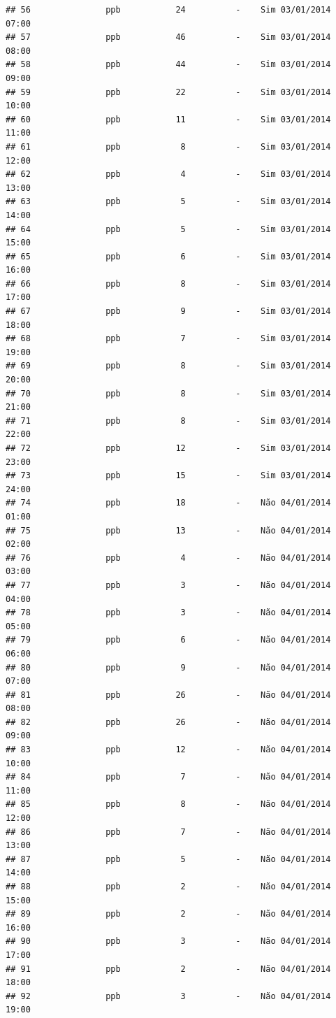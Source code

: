 \documentclass[]{book}
\begin{document}
\begin{verbatim}
## 56               ppb           24          -    Sim 03/01/2014 07:00
## 57               ppb           46          -    Sim 03/01/2014 08:00
## 58               ppb           44          -    Sim 03/01/2014 09:00
## 59               ppb           22          -    Sim 03/01/2014 10:00
## 60               ppb           11          -    Sim 03/01/2014 11:00
## 61               ppb            8          -    Sim 03/01/2014 12:00
## 62               ppb            4          -    Sim 03/01/2014 13:00
## 63               ppb            5          -    Sim 03/01/2014 14:00
## 64               ppb            5          -    Sim 03/01/2014 15:00
## 65               ppb            6          -    Sim 03/01/2014 16:00
## 66               ppb            8          -    Sim 03/01/2014 17:00
## 67               ppb            9          -    Sim 03/01/2014 18:00
## 68               ppb            7          -    Sim 03/01/2014 19:00
## 69               ppb            8          -    Sim 03/01/2014 20:00
## 70               ppb            8          -    Sim 03/01/2014 21:00
## 71               ppb            8          -    Sim 03/01/2014 22:00
## 72               ppb           12          -    Sim 03/01/2014 23:00
## 73               ppb           15          -    Sim 03/01/2014 24:00
## 74               ppb           18          -    Não 04/01/2014 01:00
## 75               ppb           13          -    Não 04/01/2014 02:00
## 76               ppb            4          -    Não 04/01/2014 03:00
## 77               ppb            3          -    Não 04/01/2014 04:00
## 78               ppb            3          -    Não 04/01/2014 05:00
## 79               ppb            6          -    Não 04/01/2014 06:00
## 80               ppb            9          -    Não 04/01/2014 07:00
## 81               ppb           26          -    Não 04/01/2014 08:00
## 82               ppb           26          -    Não 04/01/2014 09:00
## 83               ppb           12          -    Não 04/01/2014 10:00
## 84               ppb            7          -    Não 04/01/2014 11:00
## 85               ppb            8          -    Não 04/01/2014 12:00
## 86               ppb            7          -    Não 04/01/2014 13:00
## 87               ppb            5          -    Não 04/01/2014 14:00
## 88               ppb            2          -    Não 04/01/2014 15:00
## 89               ppb            2          -    Não 04/01/2014 16:00
## 90               ppb            3          -    Não 04/01/2014 17:00
## 91               ppb            2          -    Não 04/01/2014 18:00
## 92               ppb            3          -    Não 04/01/2014 19:00

\end{verbatim}
\end{document}
